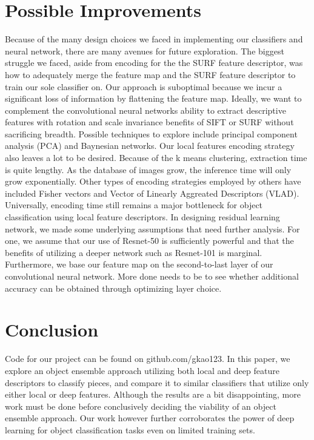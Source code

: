 \documentclass{article}
\begin{document}
\section{Possible Improvements}
\label{sec:typestyle}
\hspace{\parindent} Because of the many design choices we faced in implementing our classifiers and neural network, there are many avenues for future exploration. The biggest struggle we faced, aside from encoding for the the SURF feature descriptor, was how to adequately merge the feature map and the SURF feature descriptor to train our sole classifier on. Our approach is suboptimal because we incur a significant loss of information by flattening the feature map. Ideally, we want to complement the convolutional neural networks ability to extract descriptive features with rotation and scale invariance benefits of SIFT or SURF without sacrificing breadth. Possible techniques to explore include principal component analysis (PCA) and Baynesian networks. \newline
\indent Our local features encoding strategy also leaves a lot to be desired. Because of the k means clustering, extraction time is quite lengthy. As the database of images grow, the inference time will only grow exponentially. Other types of encoding strategies employed by others have included Fisher vectors and Vector of Linearly Aggreated Descriptors (VLAD). Universally, encoding time still remains a major bottleneck for object classification using local feature descriptors.
\newline\indent In designing residual learning network, we made some underlying assumptions that need further analysis. For one, we assume that our use of Resnet-50 is sufficiently powerful and that the benefits of utilizing a deeper network such as Resnet-101 is marginal. Furthermore, we base our feature map on the second-to-last layer of our convolutional neural network. More done needs to be to see whether additional accuracy can be obtained through optimizing layer choice.


\section{Conclusion}
\label{sec:typestyle}
\hspace{\parindent} 
Code for our project can be found on github.com/gkao123. In this paper, we explore an object ensemble approach utilizing both local and deep feature descriptors to classify pieces, and compare it to similar classifiers that utilize only either local or deep features. Although the results are a bit disappointing, more work must be done before conclusively deciding the viability of an object ensemble approach. Our work however further corroborates the power of deep learning for object classification tasks even on limited training sets. 
\end{document}
